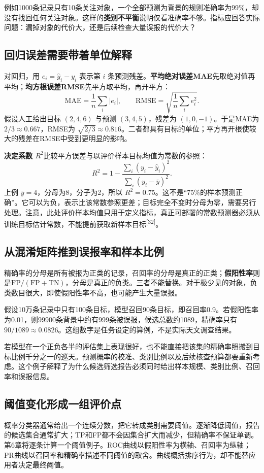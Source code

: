例如1000条记录只有10条关注对象，一个全部预测为背景的规则准确率为99\%，却没有找回任何关注对象。这样的\textbf{类别不平衡}说明仅看准确率不够。指标应回答实际问题：漏掉对象的代价大，还是后续检查大量误报的代价大？

\subsection{回归误差需要带着单位解释}
对回归，用 $e_i=\hat y_i-y_i$ 表示第 $i$ 条预测残差。\textbf{平均绝对误差MAE}先取绝对值再平均；\textbf{均方根误差RMSE}先平方取平均，再开平方：
\[
\mathrm{MAE}=\frac1n\sum_i|e_i|,\qquad
\mathrm{RMSE}=\sqrt{\frac1n\sum_i e_i^2}.
\]
假设人工给出目标 $(2,4,6)$ 与预测 $(3,4,5)$，残差为 $(1,0,-1)$。于是MAE为 $2/3\approx0.667$，RMSE为 $\sqrt{2/3}\approx0.816$。二者都具有目标的单位；平方再开根使较大的残差在RMSE中受到更明显的影响。

\textbf{决定系数 $R^2$}比较平方误差与以评价样本目标均值为常数的参照：
\[
R^2=1-\frac{\sum_i(y_i-\hat y_i)^2}{\sum_i(y_i-\bar y)^2}.
\]
上例 $\bar y=4$，分母为8，分子为2，所以 $R^2=0.75$。这不是“75\%的样本预测正确”。它可以为负，表示比该常数参照更差；目标完全不变时分母为零，需要另行处理。注意，此处评价样本均值只用于定义指标，真正可部署的常数预测器必须从训练目标估计常数，不能提前获取新样本目标\textsuperscript{[32]}。

\subsection{从混淆矩阵推到误报率和样本比例}
精确率的分母是所有被报为正类的记录，召回率的分母是真正的正类；\textbf{假阳性率}则是$\mathrm{FP}/(\mathrm{FP}+\mathrm{TN})$，分母是真正的负类。三者不能替换。对于极少见的对象，负类数目很大，即使假阳性率不高，也可能产生大量误报。

假设10万条记录中只有100条目标，模型召回90条目标，即召回率0.9。若假阳性率为0.01，则99900条背景中约有999条被误报，候选总数约1089，精确率只有$90/1089\approx0.0826$。这组数字是任务设定的算例，不是实际天文调查结果。

若模型在一个正负各半的评估集上表现很好，也不能直接把该集的精确率照搬到目标比例千分之一的巡天。预测概率的校准、类别比例以及后续核查预算都要重新考虑。这个例子解释了为什么候选筛选报告必须同时给出样本规模、类别比例、召回率和误报信息。

\subsection{阈值变化形成一组评价点}
概率分类器通常给出一个连续分数，把它转成类别需要阈值。逐渐降低阈值，报告的候选集合通常扩大；TP和FP都不会因集合扩大而减少，但精确率不保证单调。第6章将逐条计算一个阈值例子。ROC曲线以假阳性率为横轴、召回率为纵轴；PR曲线以召回率和精确率描述不同阈值的取舍。曲线概括排序行为，却不能替应用者决定最终阈值。

